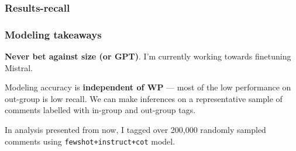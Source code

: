 % 
% 
% 
% 
% 
%     
% 
% 
% 
% 

\begin{frame}[c]\frametitle{Results-recall}
    
\end{frame}

\begin{frame}[c]\frametitle{Modeling takeaways}

\textbf{Never bet against size (or GPT)}. I'm currently working towards finetuning Mistral.

\pause\vfill

Modeling accuracy is \textbf{independent of WP} --- most of the low performance on out-group is low recall. We can make inferences on a representative sample of comments labelled with in-group and out-group tags.

\pause\vfill

In analysis presented from now, I tagged over 200,000 randomly sampled comments using \texttt{fewshot+instruct+cot} model.

\end{frame}

